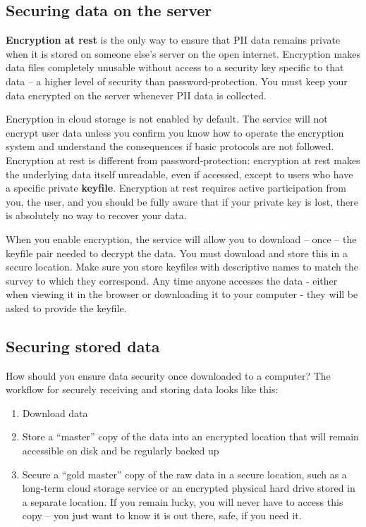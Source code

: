 {\subsection{Securing data on the server}
\textbf{Encryption at rest} is the only way to ensure that PII data remains private when it is stored on someone else's server on the open internet.
Encryption makes data files completely unusable without access to a security key specific to that data --
a higher level of security than password-protection. You must keep your data encrypted on the server whenever PII data is collected. 

Encryption in cloud storage is not enabled by default. The service will not encrypt user data unless you confirm you know how to operate the encryption system and understand the consequences if basic protocols are not followed.
Encryption at rest is different from password-protection: encryption at rest makes the underlying data itself unreadable, even if accessed, except to users who have a specific private \textbf{keyfile}. Encryption at rest requires active participation from you, the user, and you should be fully aware that if your private key is lost, there is absolutely no way to recover your data.

When you enable encryption, the service will allow you to download -- once -- the keyfile pair needed to decrypt the data.
You must download and store this in a secure location. Make sure you store keyfiles with descriptive names to match the survey to which they correspond.
Any time anyone accesses the data - either when viewing it in the browser or downloading it to your computer - they will be asked to provide the keyfile. 


\subsection{Securing stored data}
How should you ensure data security once downloaded to a computer? 
The workflow for securely receiving and storing data looks like this:

\begin{enumerate}
	\item Download data
	\item Store a ``master'' copy of the data into an encrypted location that will remain accessible on disk and be regularly backed up
	\item Secure a ``gold master'' copy of the raw data in a secure location, such as a long-term cloud storage service or an encrypted physical hard drive stored in a separate location. If you remain lucky, you will never have to access this copy -- you just want to know it is out there, safe, if you need it.
	

\end{enumerate}}
